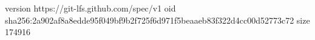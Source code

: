 version https://git-lfs.github.com/spec/v1
oid sha256:2a902af8a8edde95f049bf9b2f725f6d971f5beaaeb83f322d4cc00d52773c72
size 174916
